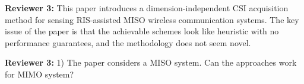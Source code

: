 \documentclass[a4paper,12pt]{article}
\begin{document}
\textbf{Reviewer 3:}
This paper introduces a dimension-independent CSI acquisition method for sensing
RIS-assisted MISO wireless communication systems. The key issue of the paper is that the achievable schemes look like heuristic with no performance guarantees, and the methodology does not seem novel.

{}

\textbf{Reviewer 3:}
1) The paper considers a MISO system. Can the approaches work for MIMO system?
\end{document}
